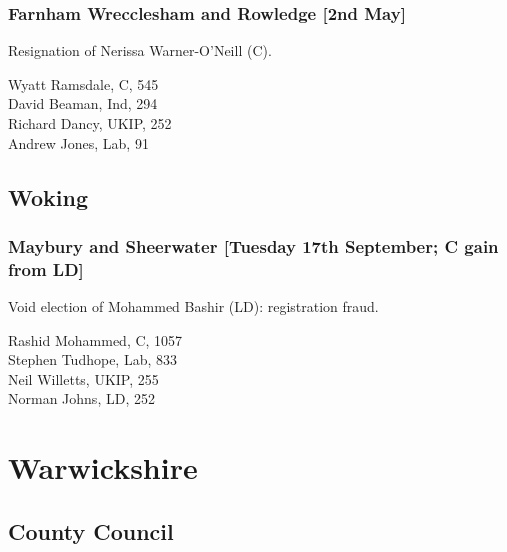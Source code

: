 \documentclass[a4paper,openany,10pt]{book}
\begin{document}
\subsubsection*{Farnham Wrecclesham and Rowledge \hspace*{\fill}\nolinebreak[1]%
\enspace\hspace*{\fill}
[2nd May]}


Resignation of Nerissa Warner-O'Neill (C).



Wyatt Ramsdale, C, 545\\
David Beaman, Ind, 294\\
Richard Dancy, UKIP, 252\\
Andrew Jones, Lab, 91\\


\subsection*{Woking}

\subsubsection*{Maybury and Sheerwater \hspace*{\fill}\nolinebreak[1]%
\enspace\hspace*{\fill}
[Tuesday 17th September; C gain from LD]}


Void election of Mohammed Bashir (LD): registration fraud.



Rashid Mohammed, C, 1057\\
Stephen Tudhope, Lab, 833\\
Neil Willetts, UKIP, 255\\
Norman Johns, LD, 252\\


\vfill

\section[Warwickshire]{{Warwickshire}}

\subsection*{County Council}
\end{document}
